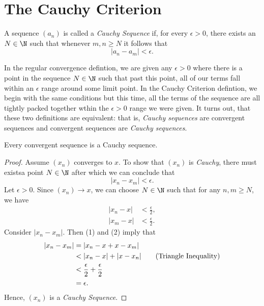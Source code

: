 \section{The Cauchy Criterion}

\begin{tcolorbox}
\begin{defn}
A sequence \((a_n)\) is called a \textit{Cauchy Sequence} if, for every \( \epsilon > 0 \), there exists an \( N \in \N \) such that whenever \( m,n \geq N \) it follows that 
\[ | a_n - a_m | < \epsilon.\]
\end{defn}
\end{tcolorbox}

In the regular convergence defintion, we are given any \( \epsilon > 0 \) where there is a point in the sequence \(N \in \N \) such that past this point, all of our terms fall within an \(\epsilon\) range around some limit point. In the Cauchy Criterion defintion, we begin with the same conditions but this time, all the terms of the sequence are all tightly packed together wthin the \(\epsilon > 0 \) range we were given. It turns out, that these two definitions are equivalent: that is, \textit{Cauchy sequences} are convergent sequences and convergent sequences are \textit{Cauchy sequences}. 

\begin{tcolorbox}
\begin{thm}
Every convergent sequence is a Cauchy sequence. 
\end{thm}
\end{tcolorbox}

\begin{proof}
Assume \((x_n)\) converges to \(x\). To show that \((x_n)\) is \textit{Cauchy}, there must existsa point \( N \in \N \) after which we can conclude that 
\[ |x_n - x_m| < \epsilon. \]
Let \( \epsilon > 0 \). Since \( (x_n) \to x \), we can choose \( N \in \N \) such that for any \( n,m \geq N \), we have 
\begin{align*}
    |x_n - x|&< \frac{\epsilon}{2}, \tag{1} \\
    |x_m - x|&< \frac{\epsilon}{2}. \tag{2}
\end{align*}
Consider \( |x_n - x_m| \). Then (1) and (2) imply that 
\begin{align*}
    |x_n - x_m|&= |x_n - x + x - x_m| \\
               &< | x_n - x | + | x - x_n | \tag{\text{Triangle Inequality}}\\  
               &< \frac{\epsilon}{2} + \frac{\epsilon}{2} \\
               &= \epsilon.
\end{align*}
Hence, \((x_n)\) is a \textit{Cauchy Sequence}.
\end{proof}

